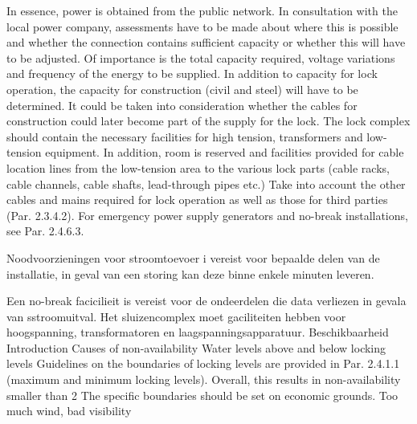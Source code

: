 In essence, power is obtained from the public network. In consultation with the local power company,
assessments have to be made about where this is possible and whether the connection contains
sufficient capacity or whether this will have to be adjusted. Of importance is the total capacity required,
voltage variations and frequency of the energy to be supplied. In addition to capacity for lock operation,
the capacity for construction (civil and steel) will have to be determined. It could be taken into consideration
whether the cables for construction could later become part of the supply for the lock.
The lock complex should contain the necessary facilities for high tension, transformers and low-tension
equipment. In addition, room is reserved and facilities provided for cable location lines from the low-tension
area to the various lock parts (cable racks, cable channels, cable shafts, lead-through pipes etc.)
Take into account the other cables and mains required for lock operation as well as those for third parties
(Par. 2.3.4.2). For emergency power supply generators and no-break installations, see Par. 2.4.6.3.

Noodvoorzieningen voor stroomtoevoer i vereist voor bepaalde delen van de installatie, in geval van een storing kan deze binne enkele minuten leveren.

Een no-break facicilieit is vereist voor de ondeerdelen die data verliezen in gevala van sstroomuitval.
Het sluizencomplex moet gaciliteiten hebben voor hoogspanning, transformatoren en laagspanningsapparatuur.
\newline \indent Beschikbaarheid
Introduction
Causes of non-availability
Water levels above and below locking levels
Guidelines on the boundaries of locking levels are provided in Par. 2.4.1.1 (maximum and minimum
locking levels). Overall, this results in non-availability smaller than 2%
The specific boundaries should be set on economic grounds.
Too much wind, bad visibility

